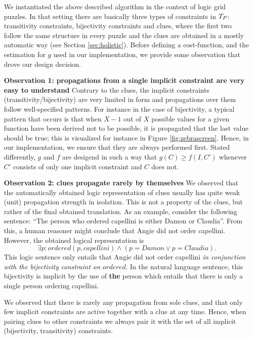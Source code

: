 We instantiated the above described algorithm in the context of logic grid puzzles. 
In that setting there are basically three types of constraints in $T_P$: transitivity constraints, bijectivity constraints and clues, where the first two follow the same structure in every puzzle and the clues are obtained in a mostly automatic way (see Section \ref{sec:holistic}). 
Before defining a cost-function, and the estimation for $g$ used in our implementation, we provide some observation that drove our design decision. 

\textbf{Observation 1: propagations from a single implicit constraint are very easy to understand} Contrary to the clues, the implicit constraints (transitivity/bijectivity) are very limited in form and propagations over them follow well-specified patterns. 
For instance in the case of bijectivity, a typical pattern that occurs is that when $X-1$ out of $X$ possible values for a given function have been derived not to be possible, it is propagated that the last value should be true; this is visualized for instance in Figure \ref{fig:zebrascreen}. 
Hence, in our implementation, we ensure that they are always performed first. Stated differently, $g$ and $f$ are desigend in such a way that $g(C)\geq f(I,C')$ whenever $C'$ consists of only one implicit constraint and $C$ does not. 

\textbf{Observation 2: clues propagate rarely by themselves}
We observed that the automatically obtained logic representation of clues usually has quite weak (unit) propagation strength in isolation. 
This is not a property of the clues, but rather of the final obtained translation. As an example, consider the following sentence: 
``The person who ordered capellini is either Damon or Claudia''. From this, a human reasoner might conclude that Angie did not order capellini. 
However, the obtained logical representation is 
\[\exists p: ordered(p,capellini)\land (p = Damon\lor p = Claudia).\]
This logic sentence only entails that Angie did not order capellini \emph{in conjunction with the bijectivity constraint on $ordered$}.
In the natural language sentence, this bijectivity is implicit by the use of \textbf{the} person which entails that there is only a single person ordering capellini. 

We observed that there is rarely any propagation from sole clues, and that only few implicit constraints are active together with a clue at any time. Hence, when pairing clues to other constraints we always pair it with the set of all implicit (bijectivity, transitivity) constraints.

